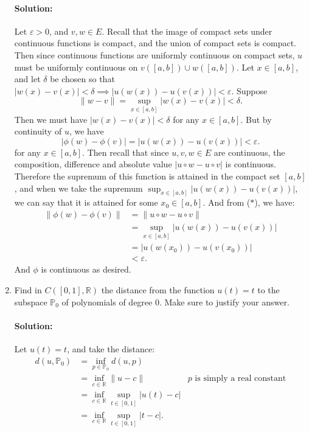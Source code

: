 \documentclass{article}
\begin{document}
\begin{enumerate}
    \paragraph{Solution: } Let $\varepsilon>0$, and $v,w\in E$. Recall that the image of compact sets under continuous functions is compact, and the union of compact sets is compact. Then since continuous functions are uniformly continuous on compact sets, $u$ must be uniformly continuous on $v([a,b])\cup w([a,b])$. Let $x\in [a,b]$, and let $\delta$ be chosen so that $|w(x)-v(x)|<\delta\implies|u(w(x))-u(v(x))|<\varepsilon$. 
    Suppose
    \[
        \|w-v\|= \sup_{x\in [a,b]}|w(x)-v(x)| <\delta \tag{$*$}
    .\] 
    Then we must have $|w(x)-v(x)|<\delta$ for any $x\in [a,b]$. But by continuity of $u$, we have 
    \[ |\phi(w)-\phi(v)|=|u(w(x))-u(v(x))|<\varepsilon .\] 
    for any $x\in [a,b]$. Then recall that since $u,v,w\in E$ are continuous, the composition, difference and absolute value $|u\circ w-u\circ v|$ is continuous. Therefore the supremum of this function is attained in the compact set $[a,b]$, and when we take the supremum $\sup_{x\in [a,b]}|u(w(x))-u(v(x))|$, we can say that it is attained for some $x_0\in [a,b]$. And from ($*$), we have:
    \begin{align*}
        \|\phi(w)-\phi(v)\|&=\|u\circ w-u\circ v\|\\
                           &=\sup_{x\in [a,b]}|u(w(x))-u(v(x))|\\
                           &=|u(w(x_0))-u(v(x_0))|\\
                           &<\varepsilon
    .\end{align*}
    And $\phi$ is continuous as desired.

\item  Find in $C([0,1],\mathbb{R})$ the distance from the function $u(t)=t$ to the subspace $\mathbb{P}_0$ of polynomials of degree $0.$ Make sure to justify your answer.
    \paragraph{Solution: }Let $u(t)=t$, and take the distance:
    \begin{align*}
        d(u,\mathbb{P}_0)&=\inf_{p\in \mathbb{P}_0}d(u,p)\\
        &= \inf_{c\in \mathbb{R}}\|u-c\| &\text{$p$ is simply a real constant}\\
        &= \inf_{c\in \mathbb{R}}\sup_{t\in [0,1]}|u(t)-c|\\
        &= \inf_{c\in \mathbb{R}}\sup_{t\in [0,1]}|t-c|
    .\end{align*}



\end{enumerate}
\end{document}
